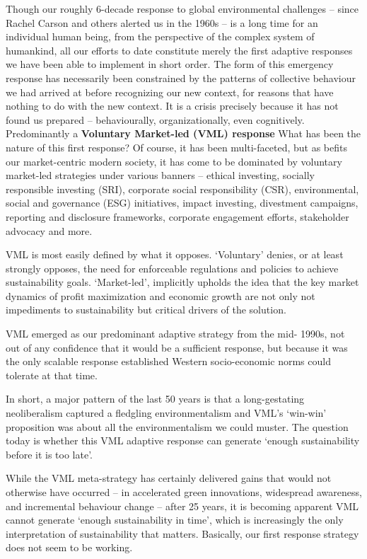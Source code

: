 \documentclass[
]{book}
\begin{document}
Though our roughly 6-decade response to global environmental challenges -- since
Rachel Carson and others alerted us in the 1960s -- is a long time for an individual human being, from
the perspective of the complex system of humankind, all our efforts to date constitute merely the
first adaptive responses we have been able to implement in short order. The form of this emergency
response has necessarily been constrained by the patterns of collective behaviour we had arrived at
before recognizing our new context, for reasons that have nothing to do with the new context. It is a
crisis precisely because it has not found us prepared -- behaviourally, organizationally, even
cognitively.
Predominantly a \textbf{Voluntary Market-led (VML) response}
What has been the nature of this first response? Of course, it has been multi-faceted, but as befits our
market-centric modern society, it has come to be dominated by voluntary market-led strategies
under various banners -- ethical investing, socially responsible investing (SRI), corporate social
responsibility (CSR), environmental, social and governance (ESG) initiatives, impact investing,
divestment campaigns, reporting and disclosure frameworks, corporate engagement efforts,
stakeholder advocacy and more.

VML is most easily defined by what it opposes. `Voluntary' denies, or at least strongly opposes, the
need for enforceable regulations and policies to achieve sustainability goals. `Market-led', implicitly
upholds the idea that the key market dynamics of profit maximization and economic growth are not
only not impediments to sustainability but critical drivers of the solution.

VML emerged as our predominant adaptive strategy from the mid-
1990s, not out of any confidence that it would be a sufficient response, but because it was the only
scalable response established Western socio-economic norms could tolerate at that time.

In short, a major pattern of the last 50 years is that a long-gestating neoliberalism captured a
fledgling environmentalism and VML's `win-win' proposition was about all the environmentalism we
could muster. The question today is whether this VML adaptive response can generate `enough
sustainability before it is too late'.

While the VML meta-strategy has certainly delivered gains that would not otherwise have occurred --
in accelerated green innovations, widespread awareness, and incremental behaviour change -- after
25 years, it is becoming apparent VML cannot generate `enough sustainability in time', which is
increasingly the only interpretation of sustainability that matters.
Basically, our first response strategy does not seem to be working.
\end{document}

